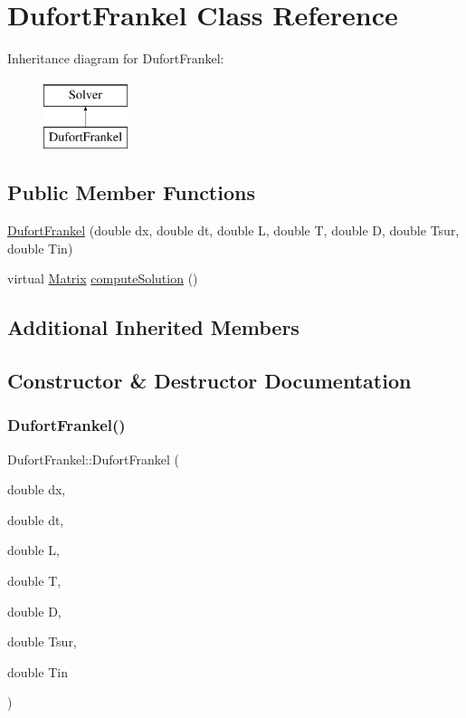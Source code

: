\hypertarget{classDufortFrankel}{}\section{Dufort\+Frankel Class Reference}
\label{classDufortFrankel}
Inheritance diagram for Dufort\+Frankel\+:\begin{figure}[H]
\begin{center}
\leavevmode
\includegraphics[height=2.000000cm]{classDufortFrankel}
\end{center}
\end{figure}
\subsection*{Public Member Functions}
\begin{DoxyCompactItemize}
\item 
\mbox{\hyperlink{classDufortFrankel_ab0c732f705d9b0aa1df228670a74b651}{Dufort\+Frankel}} (double dx, double dt, double L, double T, double D, double Tsur, double Tin)
\item 
virtual \mbox{\hyperlink{classMatrix}{Matrix}} \mbox{\hyperlink{classDufortFrankel_aad9f0443398cd3f32b44739c1133fa94}{compute\+Solution}} ()
\end{DoxyCompactItemize}
\subsection*{Additional Inherited Members}


\subsection{Constructor \& Destructor Documentation}
\mbox{\label{classDufortFrankel_ab0c732f705d9b0aa1df228670a74b651}} 
\subsubsection{\texorpdfstring{Dufort\+Frankel()}{DufortFrankel()}}
{\footnotesize\ttfamily Dufort\+Frankel\+::\+Dufort\+Frankel (\begin{DoxyParamCaption}\item[{double}]{dx,  }\item[{double}]{dt,  }\item[{double}]{L,  }\item[{double}]{T,  }\item[{double}]{D,  }\item[{double}]{Tsur,  }\item[{double}]{Tin }\end{DoxyParamCaption})}

